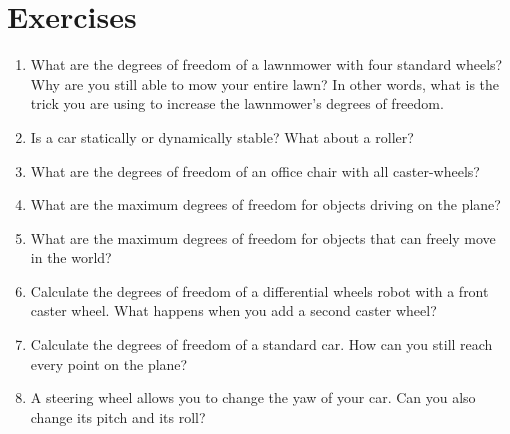 \section*{Exercises}\small
\begin{enumerate}
\item What are the degrees of freedom of a lawnmower with four standard wheels? Why are you still able to mow your entire lawn? In other words, what is the trick you are using to increase the lawnmower's degrees of freedom.
\item Is a car statically or dynamically stable? What about a roller?
\item What are the degrees of freedom of an office chair with all caster-wheels?
\item What are the maximum degrees of freedom for objects driving on the plane?
\item What are the maximum degrees of freedom for objects that can freely move in the world?
\item Calculate the degrees of freedom of a differential wheels robot with a front caster wheel. What happens when you add a second caster wheel?
\item Calculate the degrees of freedom of a standard car. How can you still reach every point on the plane?
\item A steering wheel allows you to change the yaw of your car. Can you also change its pitch and its roll?
\end{enumerate}\normalsize
